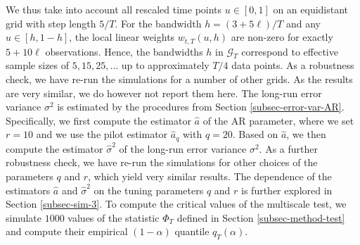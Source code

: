 We thus take into account all rescaled time points $u \in [0,1]$ on an equidistant grid with step length $5/T$. For the bandwidth $h = (3 + 5\ell)/T$ and any $u \in [h,1-h]$, the local linear weights $w_{t,T}(u,h)$ are non-zero for exactly $5 + 10 \ell$ observations. Hence, the bandwidths $h$ in $\mathcal{G}_T$ correspond to effective sample sizes of $5, 15, 25, \ldots$ up to approximately $T/4$ data points. As a robustness check, we have re-run the simulations for a number of other grids. As the results are very similar, we do however not report them here. The long-run error variance $\sigma^2$ is estimated by the procedures from Section \ref{subsec-error-var-AR}. Specifically, we first compute the estimator $\widehat{a}$ of the AR parameter, where we set $r = 10$ and we use the pilot estimator $\widehat{a}_q$ with $q = 20$. Based on $\widehat{a}$, we then compute the estimator $\widehat{\sigma}^2$ of the long-run error variance $\sigma^2$. As a further robustness check, we have re-run the simulations for other choices of the parameters $q$ and $r$, which yield very similar results. The dependence of the estimators $\widehat{a}$ and $\widehat{\sigma}^2$ on the tuning parameters $q$ and $r$ is further explored in Section \ref{subsec-sim-3}. To compute the critical values of the multiscale test, we simulate $1000$ values of the statistic $\Phi_T$ defined in Section \ref{subsec-method-test} and compute their empirical $(1-\alpha)$ quantile $q_T(\alpha)$. 


